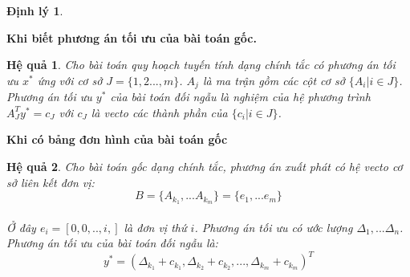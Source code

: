\documentclass[12pt,a4paper]{report}
\newtheorem{dl}{Định lý}
\newtheorem{hq}{Hệ quả}
\begin{document}
\begin{itemize}
\begin{dl}
    \end{dl}
    \textbf{Khi biết phương án tối ưu của bài toán gốc.}\\
    \begin{hq}
        Cho bài toán quy hoạch tuyến tính dạng chính tắc có phương án tối ưu $x^*$ ứng với cơ sở $J=\{1,2...,m\}$. $A_j$ là ma trận gồm các cột cơ sở $\{A_i|i\in J\}$. Phương án tối ưu $y^*$ của bài toán đối ngẫu là nghiệm của hệ phương trình $A^T_J y^*=c_J$ với $c_J$ là vecto các thành phần của $\{c_i| i\in J\}$.
    \end{hq}
\textbf{Khi có bảng đơn hình của bài toán gốc}
 \begin{hq}
        Cho bài toán gốc dạng chính tắc, phương án xuất phát có hệ vecto cơ sở liên kết đơn vị:\\
        $$B=\{A_{k_1},...A_{k_m}\}=\{e_1,...e_m\} $$\\
        Ở đây $e_i=[0,0,..,i,]$ là đơn vị thứ $i$. Phương án tối ưu có ước lượng $\Delta_1,...\Delta_n$. Phương án tối ưu của bài toán đối ngẫu là:\\
        $$y^*=(\Delta_{k_1}+c_{k_1},\Delta_{k_2}+c_{k_2},...,\Delta_{k_m}+c_{k_m})^T$$
    \end{hq}
    \end{itemize}
\end{document}
